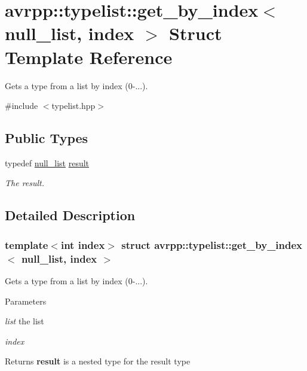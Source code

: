 \hypertarget{structavrpp_1_1typelist_1_1get__by__index_3_01null__list_00_01index_01_4}{
\section{avrpp::typelist::get\_\-by\_\-index$<$ null\_\-list, index $>$ Struct Template Reference}
\label{structavrpp_1_1typelist_1_1get__by__index_3_01null__list_00_01index_01_4}
}


Gets a type from a list by index (0-\/...).  




{\ttfamily \#include $<$typelist.hpp$>$}

\subsection*{Public Types}
\begin{DoxyCompactItemize}
\item 
typedef \hyperlink{structavrpp_1_1typelist_1_1null__list}{null\_\-list} \hyperlink{structavrpp_1_1typelist_1_1get__by__index_3_01null__list_00_01index_01_4_a39059b0b8af3c8d44ba9c1330463e62b}{result}
\begin{DoxyCompactList}\small\item\em The result. \item\end{DoxyCompactList}\end{DoxyCompactItemize}


\subsection{Detailed Description}
\subsubsection*{template$<$int index$>$ struct avrpp::typelist::get\_\-by\_\-index$<$ null\_\-list, index $>$}

Gets a type from a list by index (0-\/...). 
\begin{DoxyParams}{Parameters}
\item[{\em list}]the list \item[{\em index}]\end{DoxyParams}
\begin{DoxyReturn}{Returns}
{\bfseries result} is a nested type for the result type 
\end{DoxyReturn}


